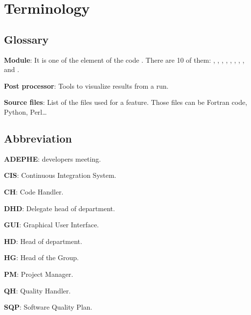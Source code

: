 \chapter{Terminology}

\section{Glossary}

\textbf{Module}: It is one of the element of the code \telemacsystem. There are
10 of them: , , \tomawac, \artemis, \sisyphe, \postel,
\bief, \stbtel, \waqtel{} and \mascaret.

\textbf{Post processor}: Tools to visualize results from a \telemacsystem{} run.

\textbf{Source files}: List of the files used for a feature. Those files can be
Fortran code, Python, Perl\ldots

\section{Abbreviation}

\textbf{ADEPHE}: \telemacsystem{} developers meeting.

\textbf{CIS}: Continuous Integration System.

\textbf{CH}: Code Handler.

\textbf{DHD}: Delegate head of department.

\textbf{GUI}: Graphical User Interface.

\textbf{HD}: Head of department.

\textbf{HG}: Head of the Group.

\textbf{PM}: Project Manager.

\textbf{QH}: Quality Handler.

\textbf{SQP}: Software Quality Plan.

